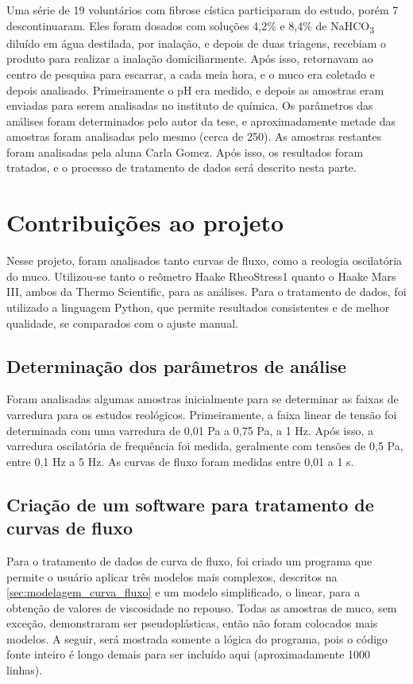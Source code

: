 	Uma série de 19 voluntários com fibrose cística participaram do estudo, porém 7 descontinuaram. Eles foram dosados com soluções 4,2\% e 8,4\% de NaHCO\textsubscript{3} diluído em água destilada, por inalação, e depois de duas triagens, recebiam o produto para realizar a inalação domiciliarmente. Após isso, retornavam ao centro de pesquisa para escarrar, a cada meia hora, e o muco era coletado e depois analisado. Primeiramente o pH era medido, e depois as amostras eram enviadas para serem analisadas no instituto de química. Os parâmetros das análises foram determinados pelo autor da tese, e aproximadamente metade das amostras foram analisadas pelo mesmo (cerca de 250). As amostras restantes foram analisadas pela aluna Carla Gomez. Após isso, os resultados foram tratados, e o processo de tratamento de dados será descrito nesta parte.


	\chapter{Contribuições ao projeto}
	
	Nesse projeto, foram analisados tanto curvas de fluxo, como a reologia oscilatória do muco. Utilizou-se tanto o reômetro Haake RheoStress1 quanto o Haake Mars III, ambos da Thermo Scientific, para as análises. Para o tratamento de dados, foi utilizado a linguagem Python, que permite resultados consistentes e de melhor qualidade, se comparados com o ajuste manual.
	
		\section{Determinação dos parâmetros de análise}
		
		Foram analisadas algumas amostras inicialmente para se determinar as faixas de varredura para os estudos reológicos. Primeiramente, a faixa linear de tensão foi determinada com uma varredura de 0,01 Pa a 0,75 Pa, a 1 Hz. Após isso, a varredura oscilatória de frequência foi medida, geralmente com tensões de 0,5 Pa, entre 0,1 Hz a 5 Hz. As curvas de fluxo foram medidas entre 0,01 a 1 s\menosUm.
	
		\section{Criação de um software para tratamento de curvas de fluxo}
		\label{sec:apn_tratamento_CF}
		Para o tratamento de dados de curva de fluxo, foi criado um programa que permite o usuário aplicar três modelos mais complexos, descritos na \autoref{sec:modelagem_curva_fluxo} e um modelo simplificado, o linear, para a obtenção de valores de viscosidade no repouso. Todas as amostras de muco, sem exceção, demonstraram ser pseudoplásticas, então não foram colocados mais modelos. A seguir, será mostrada somente a lógica do programa, pois o código fonte inteiro é longo demais para ser incluído aqui (aproximadamente 1000 linhas).
		
